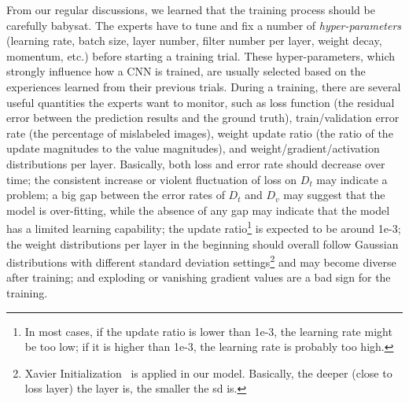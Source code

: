 \documentclass[format=acmsmall, review=false, screen=true]{acmart}
\newcommand{\dy}{\textcolor[rgb]{0,0,0}}
\begin{document}
From our regular discussions, we learned that the training process should be carefully babysat. The experts have to tune and fix a number of \textit{hyper-parameters} (learning rate, batch size, layer number, filter number per layer, weight decay, momentum, etc.) before starting a training trial.
These hyper-parameters, which strongly influence how a CNN is trained, are usually selected based on the experiences learned from their previous trials. 
During a training, there are several useful quantities the experts want to monitor, such as loss function (the residual error between the prediction results and the ground truth), train/validation error rate (the percentage of mislabeled images), weight update ratio (the ratio of the update magnitudes to the value magnitudes), and weight/gradient/activation distributions per layer. Basically, both loss and error rate should decrease over time; the consistent increase or violent fluctuation of loss on $D_t$ may indicate a problem; a big gap between the error rates of $D_t$ and $D_v$ may suggest that the model is over-fitting, while the absence of any gap may indicate that the model has a limited learning capability; the update ratio\footnote{In most cases, if the update ratio is lower than 1e-3, the learning rate might be too low; if it is higher than 1e-3, the learning rate is probably too high.} is expected to be around 1e-3; the weight distributions per layer in the beginning should overall follow Gaussian distributions with different standard deviation settings\footnote{\label{note7}Xavier Initialization~\cite{glorot2010understanding} is applied in our model. Basically, the deeper (close to loss layer) the layer is, the smaller the sd is.} and may become diverse after training; and exploding or vanishing gradient values are a bad sign for the training.
\end{document}
